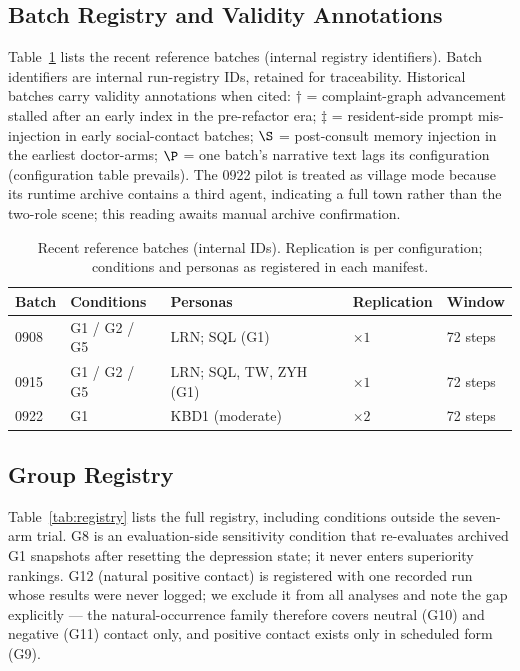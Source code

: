 \documentclass[10pt]{article}
\begin{document}
\subsection{Batch Registry and Validity Annotations}

Table~\ref{tab:batches} lists the recent reference batches (internal registry identifiers).
Batch identifiers are internal run-registry IDs, retained for traceability.
Historical batches carry validity annotations when cited: $\dagger$ = complaint-graph advancement stalled after an early index in the pre-refactor era; $\ddagger$ = resident-side prompt mis-injection in early social-contact batches; $\S$ = post-consult memory injection in the earliest doctor-arms; $\P$ = one batch's narrative text lags its configuration (configuration table prevails).
The 0922 pilot is treated as village mode because its runtime archive contains a third agent, indicating a full town rather than the two-role scene; this reading awaits manual archive confirmation.

\begin{table}[h]
\centering
\caption{Recent reference batches (internal IDs). Replication is per configuration; conditions and personas as registered in each manifest.}
\label{tab:batches}
\small
\begin{tabular}{@{}lllll@{}}
\toprule
Batch & Conditions & Personas & Replication & Window \\
\midrule
0908 & G1 / G2 / G5 & LRN; SQL (G1) & $\times 1$ & 72 steps \\
0915 & G1 / G2 / G5 & LRN; SQL, TW, ZYH (G1) & $\times 1$ & 72 steps \\
0922 & G1 & KBD1 (moderate) & $\times 2$ & 72 steps \\
\bottomrule
\end{tabular}
\end{table}

\subsection{Group Registry}

Table~\ref{tab:registry} lists the full registry, including conditions outside the seven-arm trial.
G8 is an evaluation-side sensitivity condition that re-evaluates archived G1 snapshots after resetting the depression state; it never enters superiority rankings.
G12 (natural positive contact) is registered with one recorded run whose results were never logged; we exclude it from all analyses and note the gap explicitly --- the natural-occurrence family therefore covers neutral (G10) and negative (G11) contact only, and positive contact exists only in scheduled form (G9).
\end{document}
